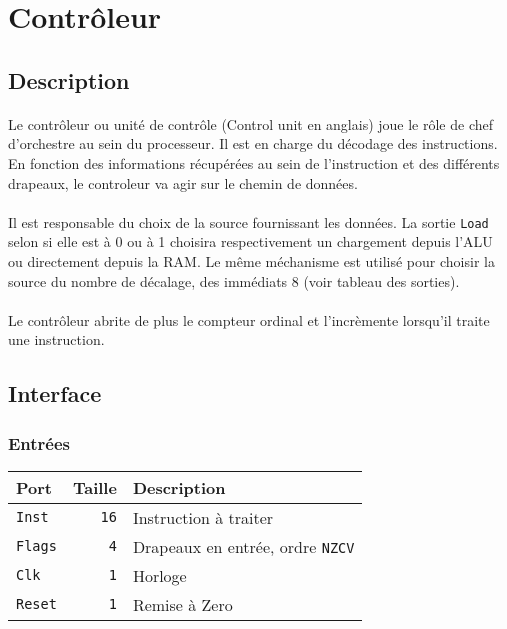 \documentclass{article}
\begin{document}
    \section{Contrôleur}

    \subsection{Description}

    \paragraph{}
    Le contrôleur ou unité de contrôle (Control unit en anglais) joue le rôle de chef d'orchestre au sein du processeur.
    Il est en charge du décodage des instructions.
    En fonction des informations récupérées au sein de l'instruction et des différents drapeaux, le controleur va agir sur le chemin de données.

    \paragraph{}
    Il est responsable du choix de la source fournissant les données.
    La sortie \texttt{Load} selon si elle est à 0 ou à 1 choisira respectivement un chargement depuis l'ALU ou directement depuis la RAM.
    Le même méchanisme est utilisé pour choisir la source du nombre de décalage, des immédiats 8 (voir tableau des sorties).

    \paragraph{}
    Le contrôleur abrite de plus le compteur ordinal et l'incrèmente lorsqu'il traite une instruction.

    \subsection{Interface}

    \subsubsection{Entrées}

    \begin{tabular}{|l|r|l|}
        \hline
        \textbf{Port}  & \textbf{Taille} & \textbf{Description}                    \\
        \hline

        \texttt{Inst}  & \texttt{16}     & Instruction à traiter                   \\
        \hline
        \texttt{Flags} & \texttt{4}      & Drapeaux en entrée, ordre \texttt{NZCV} \\
        \hline
        \texttt{Clk}   & \texttt{1}      & Horloge                                 \\
        \hline
        \texttt{Reset} & \texttt{1}      & Remise à Zero                           \\
        \hline


        \hline
    \end{tabular}
\end{document}
